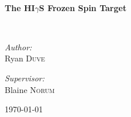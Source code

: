\begin{titlepage}
\begin{center}
\HRule \\[0.4cm]
{ \huge \bfseries The HI$\gamma$S Frozen Spin Target \\[0.4cm] }

\HRule \\[1.5cm]

\begin{minipage}{0.4\textwidth}
\begin{flushleft} \large
\emph{Author:}\\
Ryan \textsc{Duve}
\end{flushleft}
\end{minipage}
\begin{minipage}{0.4\textwidth}
\begin{flushright} \large
\emph{Supervisor:} \\
Blaine \textsc{Norum}
\end{flushright}
\end{minipage}

\vfill

{\large \today}

\end{center}
\end{titlepage}